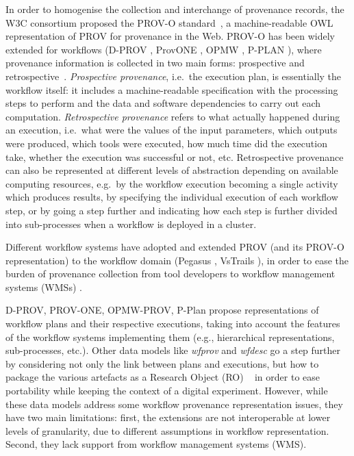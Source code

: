 In order to homogenise the collection and interchange of provenance records, the W3C consortium proposed the PROV-O standard~\cite{w3-prov-o}, a machine-readable OWL \cite{w3-owl2-overview} representation of PROV for provenance in the Web.
PROV-O has been widely extended for workflows (D-PROV \cite{Missier 2013}, ProvONE \cite{Cuevas-Vicenttín 2016}, OPMW \cite{Garijo 2011}, P-PLAN \cite{Garijo 2012}), where provenance information is collected in two main forms: prospective and retrospective~\cite{Freire 2008}. \emph{Prospective provenance}, i.e.~the execution plan, is essentially the workflow itself: it includes a machine-readable specification with the processing steps to perform and the data and software dependencies to carry out each computation.
\emph{Retrospective provenance} refers to what actually happened during an execution, i.e.~what were the values of the input parameters, which outputs were produced, which tools were executed, how much time did the execution take, whether the execution was successful or not, etc.
Retrospective provenance can also be represented at different levels of abstraction depending on available computing resources, e.g.~by the workflow execution becoming a single activity which produces results, by specifying the individual execution of each workflow step, or by going a step further and indicating how each step is further divided into sub-processes when a workflow is deployed in a cluster.

Different workflow systems have adopted and extended PROV (and its PROV-O representation) to the workflow domain (Pegasus \cite{Deelman 2005}, VsTrails \cite{Scheidegger 2008}), in order to ease the burden of provenance collection from tool developers to workflow management systems (WMSs) \cite{Atkinson 2017}.

D-PROV, PROV-ONE, OPMW-PROV, P-Plan propose representations of workflow plans and their respective executions, taking into account the features of the workflow systems implementing them (e.g., hierarchical representations, sub-processes, etc.).
Other data models like \emph{wfprov} and \emph{wfdesc}
\cite{Belhajjame 2015} go a step further by considering not only the link between plans and executions, but how to package the various artefacts as a Research Object (RO) ~\cite{Bechhofer 2013} in order to ease portability while keeping the context of a digital experiment.
However, while these data models address some workflow provenance representation issues, they have two main limitations: first, the extensions are not interoperable at lower levels of granularity, due to different assumptions in workflow representation.
Second, they lack support from workflow management systems (WMS).

